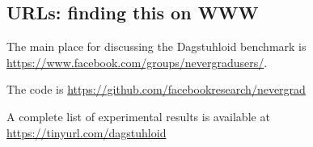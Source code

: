 \documentclass{article}
\begin{document}


\subsection{URLs: finding this on WWW}
The main place for discussing the Dagstuhloid benchmark is \url{https://www.facebook.com/groups/nevergradusers/}. 

The code is \url{https://github.com/facebookresearch/nevergrad}

A complete list of experimental results is available at \url{https://tinyurl.com/dagstuhloid}
\end{document}
